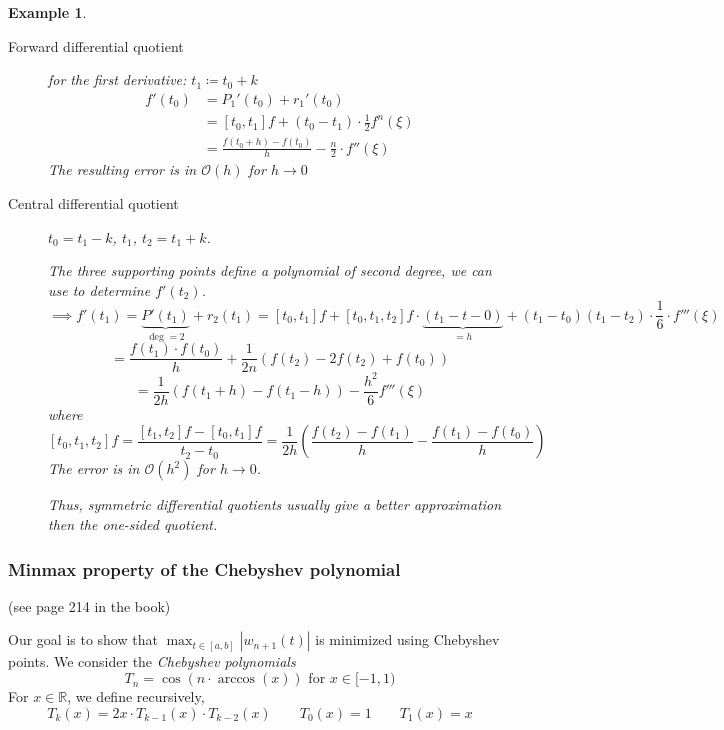 \documentclass[a4paper]{article}
\newcounter{lecref}[section]
\numberwithin{lecref}{section}
\theoremstyle{break}
\newtheorem{example}[lecref]{Example}
\newcommand{\Abs}[1]{\left|#1\right|}
\begin{document}
\begin{example}
  \label{example:4-16}
  \begin{description}
    \item[Forward differential quotient] for the first derivative: $t_1 \coloneqq t_0 + k$
      \begin{align*}
        f'(t_0) &= P_1'(t_0) + r_1'(t_0) \\
          &= [t_0, t_1] f + (t_0 - t_1) \cdot \frac12 f^n(\xi) \\
          &= \frac{f(t_0 + h) - f(t_0)}{h} - \frac{n}2 \cdot f''(\xi)
      \end{align*}
      The resulting error is in $\mathcal O(h)$ for $h \to 0$
    \item[Central differential quotient]
      $t_0 = t_1 - k$, $t_1$, $t_2 = t_1 + k$.

      The three supporting points define a polynomial of second degree,
      we can use to determine $f'(t_2)$.
      \[ \implies f'(t_1) = \underbrace{P'(t_1)}_{\deg = 2} + r_2(t_1) = [t_0, t_1] f + [t_0, t_1, t_2] f \cdot \underbrace{(t_1 - t-0)}_{= h} + (t_1 - t_0)(t_1 - t_2) \cdot \frac16 \cdot f'''(\xi) \]
      \[ = \frac{f(t_1) \cdot f(t_0)}{h} + \frac1{2n} \left(f(t_2) - 2f(t_2) + f(t_0)\right) \]
      \[ = \frac{1}{2h} (f(t_1 + h) - f(t_1 - h)) - \frac{h^2}{6} f'''(\xi) \]
      where
      \[ [t_0, t_1, t_2] f = \frac{[t_1, t_2] f - [t_0, t_1] f}{t_2 - t_0} = \frac{1}{2h} \left(\frac{f(t_2) - f(t_1)}{h} - \frac{f(t_1) - f(t_0)}{h}\right) \]
      The error is in $\mathcal O(h^2)$ for $h \to 0$.

      Thus, symmetric differential quotients usually give a better approximation then the one-sided quotient.
  \end{description}
\end{example}

\subsubsection{Minmax property of the Chebyshev polynomial}

(see page 214 in the book)

Our goal is to show that $\max_{t \in [a, b]} \Abs{w_{n+1}(t)}$ is minimized using Chebyshev points.
We consider the \emph{Chebyshev polynomials}
\[ T_n = \cos(n \cdot \arccos(x)) \text{ for } x \in [-1, 1) \]
For $x \in \mathbb R$, we define recursively,
\[ T_k(x) = 2x \cdot T_{k-1}(x) \cdot T_{k-2}(x) \qquad T_0(x) = 1 \qquad T_1(x) = x \]
\end{document}

